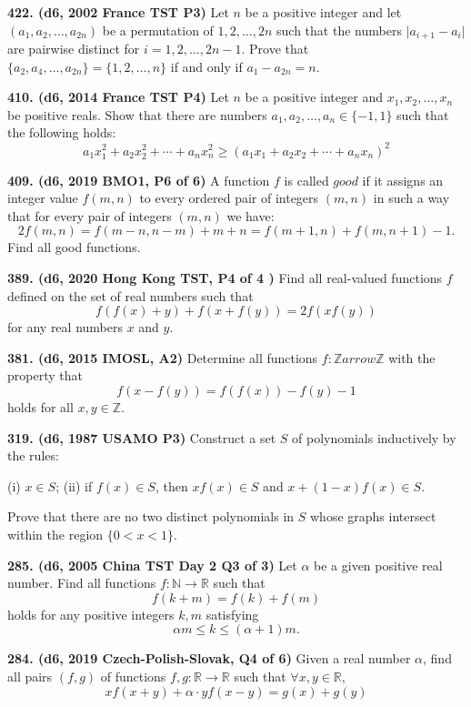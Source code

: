 \documentclass{article}
\begin{document}
\textbf{422. (\color{red}d6\color{black}, 2002 France TST P3)} Let $n$ be a positive integer and let $(a_1, a_2, \dots , a_{2n})$ be a permutation of $1, 2, \dots , 2n$ such that the numbers $\lvert a_{i + 1} - a_i \rvert$ are pairwise distinct for $i = 1, 2, \dots , 2n-1.$ Prove that $\{ a_2, a_4, \dots , a_{2n} \}  = \{1, 2, \dots , n\}$ if and only if $a_1 - a_{2n} = n.$

\textbf{410. (\color{red}d6\color{black}, 2014 France TST P4)} Let $n$ be a positive integer and $x_1,x_2,\ldots,x_n$ be positive reals. Show that there are numbers $a_1,a_2,\ldots, a_n \in \{-1,1\}$ such that the following holds:
\[a_1x_1^2+a_2x_2^2+\cdots+a_nx_n^2 \ge (a_1x_1+a_2x_2 +\cdots+a_nx_n)^2\]

\textbf{409. (\color{red}d6\color{black}, 2019 BMO1, P6 of 6)} A function $f$ is called $good$ if it assigns an integer value $f(m, n)$ to every ordered pair of integers $(m, n)$ in such a way that for every pair of integers $(m, n)$ we have:
$$2f(m, n) = f(m-n, n-m) + m + n = f(m+1, n) + f(m, n+1) - 1.$$
Find all good functions.

\textbf{389. (\color{red}d6\color{black}, 2020 Hong Kong TST, P4 of 4 )} Find all real-valued functions $f$ defined on the set of real numbers such that$$f(f(x)+y)+f(x+f(y))=2f(xf(y))$$for any real numbers $x$ and $y$.

\textbf{381. (\color{red}d6\color{black}, 2015 IMOSL, A2)} Determine all functions $f:\mathbb{Z}arrow\mathbb{Z}$ with the property that \[f(x-f(y))=f(f(x))-f(y)-1\]holds for all $x,y\in\mathbb{Z}$.

\textbf{319. (\color{red}d6\color{black}, 1987 USAMO P3)} Construct a set $S$ of polynomials inductively by the rules:

(i) $x\in S$;
(ii) if $f(x)\in S$, then $xf(x)\in S$ and $x+(1-x)f(x)\in S$.

Prove that there are no two distinct polynomials in $S$ whose graphs intersect within the region $\{0 < x < 1\}$.

\textbf{285. (\color{red}d6\color{black}, 2005 China TST Day 2 Q3 of 3)} Let $\alpha$ be a given positive real number. Find all functions $f: \mathbb{N} \to \mathbb{R}$ such that $$f(k + m) = f(k) + f(m)$$ holds for any positive integers $k, m$ satisfying $$\alpha m \leq k \leq (\alpha + 1)m.$$

\textbf{284. (\color{red}d6\color{black}, 2019 Czech-Polish-Slovak, Q4 of 6)} Given a real number $\alpha$, find all pairs $(f,g)$ of functions $f,g :\mathbb{R} \to \mathbb{R}$ such that $\forall x, y \in \mathbb{R}$, $$xf(x+y)+\alpha \cdot yf(x-y)=g(x)+g(y)$$
\end{document}

